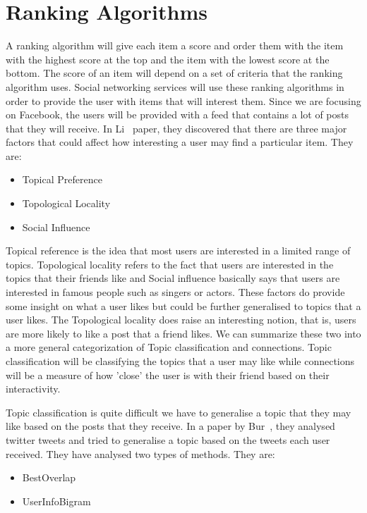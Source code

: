 \section{Ranking Algorithms}

A ranking algorithm will give each item a score and order them with the item with the highest score at the top and the item with the lowest score at the bottom. The score of an item will depend on a set of criteria that the ranking algorithm uses. Social networking services will use these ranking algorithms in order to provide the user with items that will interest them. Since we are focusing on Facebook, the users will be provided with a feed that contains a lot of posts that they will receive. In Li~\cite{LiTiaLee2010} paper, they discovered that there are three major factors that could affect how interesting a user may find a particular item. They are:


\begin{itemize}
 \item Topical Preference
 \item Topological Locality
 \item Social Influence
\end{itemize}

Topical reference is the idea that most users are interested in a limited range of topics. Topological locality refers to the fact that users are interested in the topics that their friends like and Social influence basically says that users are interested in famous people such as singers or actors. These factors do provide some insight on what a user likes but could be further generalised to topics that a user likes. The Topological locality does raise an interesting notion, that is, users are more likely to like a post that a friend likes. We can summarize these two into a more general categorization of Topic classification and connections. Topic classification will be classifying the topics that a user may like while connections will be a measure of how 'close' the user is with their friend based on their interactivity. 

Topic classification is quite difficult we have to generalise a topic that they may like based on the posts that they receive. In a paper by Bur~\cite{Bur2013}, they analysed twitter tweets and tried to generalise a topic based on the tweets each user received. They have analysed two types of methods. They are:
\begin{itemize}
 \item BestOverlap
 \item UserInfoBigram
\end{itemize}

